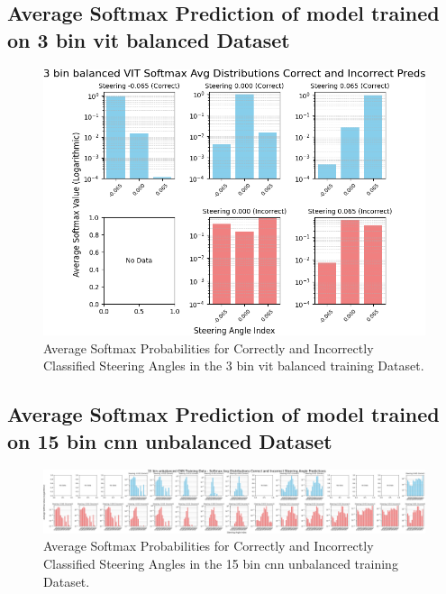 
\subsection{Average Softmax Prediction of model trained on 3 bin vit balanced Dataset}

\begin{figure}[H]
    \centering
    \includegraphics[width=1\linewidth]{Figures/Results/3_bins_vit_softmax_dist_plot_balanced.png}
    \caption{Average Softmax Probabilities for Correctly and Incorrectly Classified Steering Angles in the 3 bin vit balanced training Dataset.}
    \label{fig:3_bins_vit_softmax_dist_balanced}
\end{figure}


\subsection{Average Softmax Prediction of model trained on 15 bin cnn unbalanced Dataset}

\begin{figure}[H]
    \centering
    \includegraphics[width=1\linewidth]{Figures/Results/15_bins_cnn_softmax_dist_plot_unbalanced.png}
    \caption{Average Softmax Probabilities for Correctly and Incorrectly Classified Steering Angles in the 15 bin cnn unbalanced training Dataset.}
    \label{fig:15_bins_cnn_softmax_dist_unbalanced}
\end{figure}

